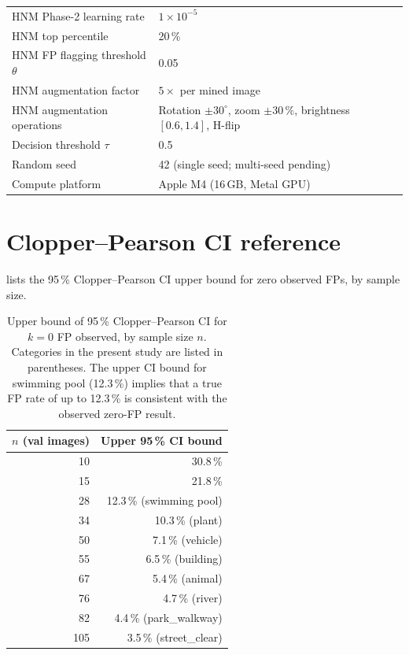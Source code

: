 \documentclass[a4paper,fleqn]{cas-sc}
\newcommand{\CP}{Clopper--Pearson\xspace}
\begin{document}
\begin{table}
\begin{tabular}{ll}
    HNM Phase-2 learning rate         & $1 \times 10^{-5}$ \\
    HNM top percentile                & 20\,\% \\
    HNM FP flagging threshold $\theta$& 0.05 \\
    HNM augmentation factor           & $5\times$ per mined image \\
    HNM augmentation operations       & Rotation $\pm 30^{\circ}$, zoom $\pm 30\,\%$,
                                        brightness $[0.6, 1.4]$, H-flip \\
    Decision threshold $\tau$         & 0.5 \\
    Random seed                       & 42 (single seed; multi-seed pending) \\
    Compute platform                  & Apple M4 (16\,GB, Metal GPU) \\
    \bottomrule
  \end{tabular}
\end{table}

\section{Clopper--Pearson CI reference}
\label{app:cp}

 lists the 95\,\% \CP{} CI upper bound for zero observed FPs, by sample size.

\begin{table}
  \centering
  \caption{Upper bound of 95\,\% \CP{} CI for $k{=}0$ FP observed,
           by sample size $n$.
           Categories in the present study are listed in parentheses.
           The upper CI bound for swimming pool (12.3\,\%) implies that
           a true FP rate of up to 12.3\,\% is consistent with the
           observed zero-FP result.}
  \label{tab:cp}
  \small
  \begin{tabular}{rr}
    \toprule
    $n$ (val images) & Upper 95\,\% CI bound \\
    \midrule
    10  & 30.8\,\% \\
    15  & 21.8\,\% \\
    28  & 12.3\,\% \quad (swimming pool) \\
    34  & 10.3\,\% \quad (plant) \\
    50  & 7.1\,\%  \quad (vehicle) \\
    55  & 6.5\,\%  \quad (building) \\
    67  & 5.4\,\%  \quad (animal) \\
    76  & 4.7\,\%  \quad (river) \\
    82  & 4.4\,\%  \quad (park\_walkway) \\
    105 & 3.5\,\%  \quad (street\_clear) \\
    \bottomrule
  \end{tabular}
\end{table}
\end{document}
